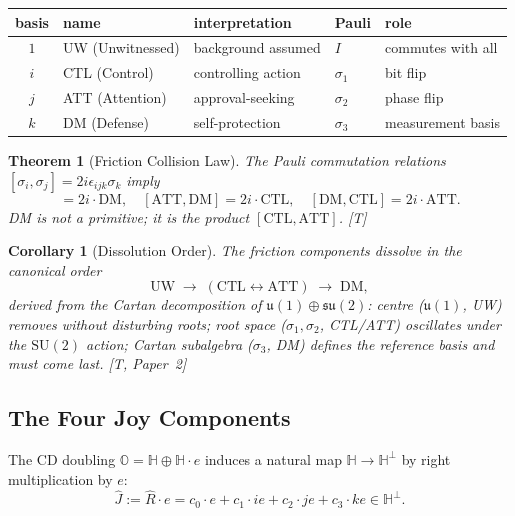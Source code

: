 \documentclass[11pt, a4paper]{article}
\newtheorem{theorem}{Theorem}
\newtheorem{corollary}{Corollary}
\newcommand{\Hq}{\mathbb{H}}
\newcommand{\Oct}{\mathbb{O}}
\newcommand{\Reop}{\hat{R}}
\newcommand{\Jop}{\hat{J}}
\begin{document}
\begin{center}
\begin{tabular}{@{}cllll@{}}
\toprule
basis & name & interpretation & Pauli & role \\
\midrule
$1$ & UW (Unwitnessed) & background assumed & $I$ & commutes with all \\
$i$ & CTL (Control) & controlling action & $\sigma_1$ & bit flip \\
$j$ & ATT (Attention) & approval-seeking & $\sigma_2$ & phase flip \\
$k$ & DM (Defense) & self-protection & $\sigma_3$ & measurement basis \\
\bottomrule
\end{tabular}
\end{center}

\begin{theorem}[Friction Collision Law]
\label{thm:friction_collision}
The Pauli commutation relations $[\sigma_i, \sigma_j]
= 2i\epsilon_{ijk}\sigma_k$ imply
\begin{equation}
[\mathrm{CTL}, \mathrm{ATT}] = 2i \cdot \mathrm{DM},
\quad [\mathrm{ATT}, \mathrm{DM}] = 2i \cdot \mathrm{CTL},
\quad [\mathrm{DM}, \mathrm{CTL}] = 2i \cdot \mathrm{ATT}.
\end{equation}
DM is not a primitive; it is the product $[\mathrm{CTL}, \mathrm{ATT}]$.
[T]
\end{theorem}

\begin{corollary}[Dissolution Order]
\label{cor:dissolution}
The friction components dissolve in the canonical order
\begin{equation}
\mathrm{UW} \;\to\; (\mathrm{CTL} \leftrightarrow \mathrm{ATT})\;\to\; \mathrm{DM},
\end{equation}
derived from the Cartan decomposition of $\mathfrak{u}(1)
\oplus \mathfrak{su}(2)$: centre ($\mathfrak{u}(1)$, UW) removes
without disturbing roots; root space ($\sigma_1, \sigma_2$,
CTL/ATT) oscillates under the $\mathrm{SU}(2)$ action;
Cartan subalgebra ($\sigma_3$, DM) defines the reference basis and
must come last. [T, Paper~2]
\end{corollary}

\subsection{The Four Joy Components}

The CD doubling $\Oct = \Hq \oplus \Hq \cdot e$ induces a natural map
$\Hq \to \Hq^\perp$ by right multiplication by $e$:
\begin{equation}
\Jop := \Reop \cdot e = c_0 \cdot e + c_1 \cdot ie + c_2 \cdot je + c_3 \cdot ke
\in \Hq^\perp.
\end{equation}
\end{document}
